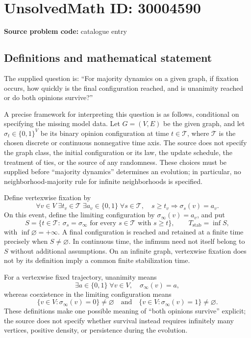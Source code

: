 \documentclass[11pt]{article}
\begin{document}
\section*{UnsolvedMath ID: 30004590}
\textbf{Source problem code:} catalogue entry
\subsection{Definitions and mathematical statement}
The supplied question is: ``For majority dynamics on a given graph, if fixation occurs, how quickly is the final configuration reached, and is unanimity reached or do both opinions survive?''

A precise framework for interpreting this question is as follows, conditional on specifying the missing model data. Let \(G=(V,E)\) be the given graph, and let \(\sigma_t\in\{0,1\}^{V}\) be its binary opinion configuration at time \(t\in\mathcal T\), where \(\mathcal T\) is the chosen discrete or continuous nonnegative time axis. The source does not specify the graph class, the initial configuration or its law, the update schedule, the treatment of ties, or the source of any randomness. These choices must be supplied before ``majority dynamics'' determines an evolution; in particular, no neighborhood-majority rule for infinite neighborhoods is specified.

Define vertexwise fixation by
\[
\forall v\in V\;\exists t_v\in\mathcal T\;\exists a_v\in\{0,1\}\;\forall s\in\mathcal T,\quad s\ge t_v\Longrightarrow\sigma_s(v)=a_v.
\]
On this event, define the limiting configuration by \(\sigma_\infty(v)=a_v\), and put
\[
S=\{t\in\mathcal T:\ \sigma_s=\sigma_\infty\text{ for every }s\in\mathcal T\text{ with }s\ge t\},
\qquad T_{\mathrm{stab}}=\inf S,
\]
with \(\inf\varnothing=+\infty\). A final configuration is reached and retained at a finite time precisely when \(S\ne\varnothing\). In continuous time, the infimum need not itself belong to \(S\) without additional assumptions. On an infinite graph, vertexwise fixation does not by its definition imply a common finite stabilization time.

For a vertexwise fixed trajectory, unanimity means
\[
\exists a\in\{0,1\}\;\forall v\in V,\quad\sigma_\infty(v)=a,
\]
whereas coexistence in the limiting configuration means
\[
\{v\in V:\sigma_\infty(v)=0\}\ne\varnothing
\quad\text{and}\quad
\{v\in V:\sigma_\infty(v)=1\}\ne\varnothing.
\]
These definitions make one possible meaning of ``both opinions survive'' explicit; the source does not specify whether survival instead requires infinitely many vertices, positive density, or persistence during the evolution.
\end{document}
